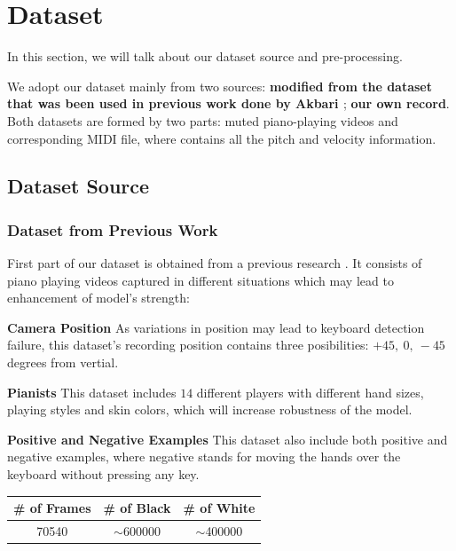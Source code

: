 \documentclass[10pt,twocolumn,letterpaper]{article}
\begin{document}
\section{Dataset}

   In this section, we will talk about our dataset source and pre-processing.

   We adopt our dataset mainly from two sources: \textbf{modified from the dataset that was been used in previous work done by Akbari \cite{Akbari}}; \textbf{our own record}.
   Both datasets are formed by two parts: muted piano-playing videos and corresponding MIDI file, where contains all the pitch and velocity information.

\subsection{Dataset Source}

   \subsubsection{Dataset from Previous Work}

   First part of our dataset is obtained from a previous research \cite{Akbari}. It consists of piano playing videos captured in different situations which may lead to enhancement of model's strength:

   \textbf{Camera Position} As variations in position may lead to keyboard detection failure, this dataset's recording position contains three posibilities: $+45,\ 0,\ -45$ degrees from vertial.

   \textbf{Pianists} This dataset includes $14$ different players with different hand sizes, playing styles and skin colors, which will increase robustness of the model.

   \textbf{Positive and Negative Examples} This dataset also include both positive and negative examples, where negative stands for moving the hands over the keyboard without pressing any key.\\
   
   \begin{minipage}{0.9\linewidth}
      \centering
   \begin{tabular}{ccc}
      \toprule
      \# of Frames&\# of Black&\# of White\\
      \midrule
      70540 & $\sim$600000 & $\sim$400000\\
      \bottomrule
      \end{tabular}
       \label{tab:prevdataset} 
   \end{minipage}
      
\end{document}
